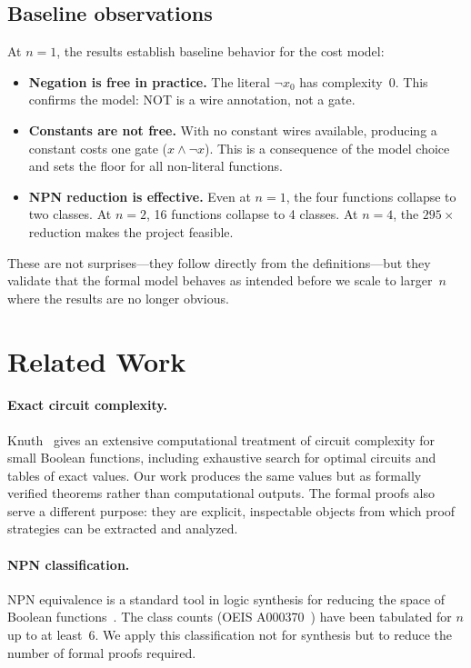 \documentclass[11pt]{article}
\begin{document}
\subsection{Baseline observations}

At $n = 1$, the results establish baseline behavior for the cost model:

\begin{itemize}[leftmargin=*]
\item \textbf{Negation is free in practice.} The literal $\lnot x_0$ has
  complexity~0. This confirms the model: NOT is a wire annotation, not a gate.

\item \textbf{Constants are not free.} With no constant wires available,
  producing a constant costs one gate ($x \land \lnot x$). This is a
  consequence of the model choice and sets the floor for all non-literal
  functions.

\item \textbf{NPN reduction is effective.} Even at $n = 1$, the four functions
  collapse to two classes. At $n = 2$, 16 functions collapse to 4 classes. At
  $n = 4$, the $295\times$ reduction makes the project feasible.
\end{itemize}

\noindent These are not surprises---they follow directly from the
definitions---but they validate that the formal model behaves as intended before
we scale to larger~$n$ where the results are no longer obvious.

\section{Related Work}

\paragraph{Exact circuit complexity.}
Knuth~\cite{knuth-4a} gives an extensive computational treatment of circuit
complexity for small Boolean functions, including exhaustive search for
optimal circuits and tables of exact values. Our work produces the same
values but as formally verified theorems rather than computational outputs. The
formal proofs also serve a different purpose: they are explicit, inspectable
objects from which proof strategies can be extracted and analyzed.

\paragraph{NPN classification.}
NPN equivalence is a standard tool in logic synthesis for reducing the space of
Boolean functions~\cite{npn-corrected}. The class counts (OEIS
A000370~\cite{oeis-a000370}) have been tabulated for $n$ up to at least~6. We
apply this classification not for synthesis but to reduce the number of formal
proofs required.
\end{document}
